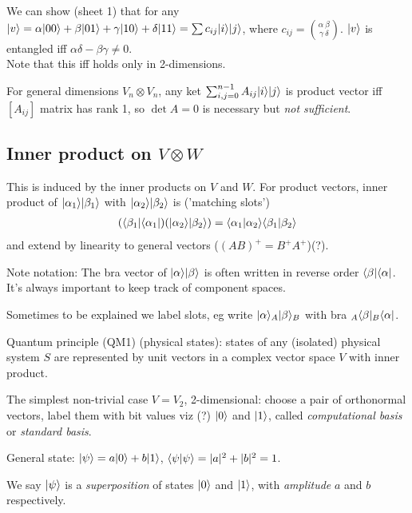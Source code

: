 \documentclass[a4paper]{article}
\begin{document}
We can show (sheet 1) that for any $|v\rangle = \alpha|00\rangle + \beta|01\rangle + \gamma|10 \rangle + \delta|11\rangle = \sum c_{ij} |i\rangle |j \rangle$, where $c_{ij} = {{\alpha\ \beta} \choose {\gamma\ \delta}}$. $|v\rangle$ is entangled iff $\alpha \delta - \beta \gamma \neq 0$. \\
Note that this iff holds only in 2-dimensions.

For general dimensions $V_n \otimes V_n$, any ket $\sum_{i,j=0}^{n-1} A_{ij} |i\rangle |j\rangle$ is product vector iff $[A_{ij}]$ matrix has rank 1, so $\det A = 0$ is necessary but \emph{not sufficient}.

\subsection{Inner product on $V \otimes W$}
This is induced by the inner products on $V$ and $W$. For product vectors, inner product of $|\alpha_1\rangle |\beta_1 \rangle$ with $|\alpha_2\rangle |\beta_2\rangle$ is ('matching slots') 
\begin{equation*}
\begin{aligned}
(\langle\beta_1|\langle\alpha_1|) (|\alpha_2\rangle |\beta_2 \rangle) = \langle \alpha_1 | \alpha_2 \rangle \langle\beta_1|\beta_2\rangle
\end{aligned}
\end{equation*}
and extend by linearity to general vectors ($(AB)^+ = B^+ A^+$)(?).

Note notation: The bra vector of $|\alpha\rangle |\beta\rangle$ is often written in reverse order $\langle \beta | \langle\alpha|$. It's always important to keep track of component spaces.

Sometimes to be explained we label slots, eg write $|\alpha\rangle_A |\beta\rangle_B$ with bra ${}_A\langle\beta|{}_B\langle\alpha|$.
 
Quantum principle (QM1) (physical states): states of any (isolated) physical system $S$ are represented by unit vectors in a complex vector space $V$ with inner product.

The simplest non-trivial case $V=V_2$, 2-dimensional: choose a pair of orthonormal vectors, label them with bit values viz (?) $|0\rangle$ and $|1\rangle$, called \emph{computational basis} or \emph{standard basis}.

General state: $|\psi\rangle = a|0\rangle + b|1\rangle$, $\langle\psi|\psi\rangle = |a|^2+|b|^2 = 1$.

We say $|\psi\rangle$ is a \emph{superposition} of states $|0\rangle$ and $|1\rangle$, with \emph{amplitude} $a$ and $b$ respectively.
\end{document}
